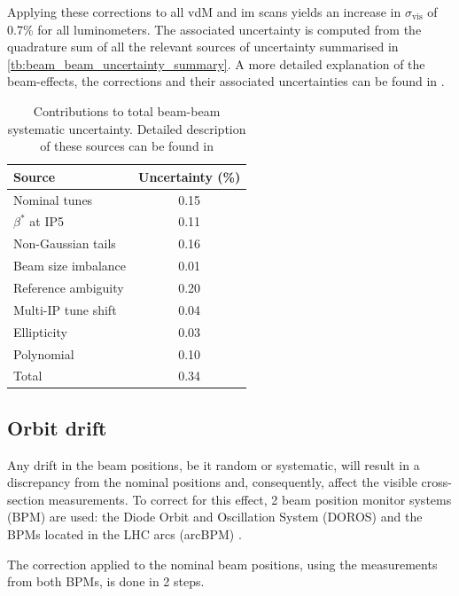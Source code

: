 Applying these corrections to all vdM and im scans yields an increase in $\sigma_{\mathrm{vis}}$ of 0.7\% for all luminometers. The associated uncertainty is computed from the quadrature sum of all the relevant sources of uncertainty summarised in \autoref{tb:beam_beam_uncertainty_summary}. A more detailed explanation of the beam-effects, the corrections and their associated uncertainties can be found in \cite{babaev2021coherentdeflectionellipticbunches}.

\begin{table}
	\centering
	\caption[Beam-beam systematic uncertainty]{Contributions to total beam-beam systematic uncertainty. Detailed description of these sources can be found in \cite{babaev2021coherentdeflectionellipticbunches}}\label{tab:bb:1}
	\label{tb:beam_beam_uncertainty_summary}
	\begin{tabular}{l|c}
		\hline
		Source & Uncertainty (\%) \\
		\hline
		Nominal tunes & 0.15 \\
		$\beta^{*}$ at IP5 & 0.11 \\
		Non-Gaussian tails & 0.16 \\
		Beam size imbalance & 0.01 \\
		Reference ambiguity & 0.20 \\
		Multi-IP tune shift & 0.04 \\
		Ellipticity & 0.03 \\
		Polynomial & 0.10 \\
		\hline
		Total & 0.34 \\
		\hline
	\end{tabular}
\end{table}

\subsection{Orbit drift}

Any drift in the beam positions, be it random or systematic, will result in a discrepancy from the nominal positions and, consequently, affect the visible cross-section measurements. To correct for this effect, 2 beam position monitor systems (BPM) are used: the Diode Orbit and Oscillation System (DOROS) \cite{Gąsior:2313935} and the BPMs located in the LHC arcs (arcBPM) \cite{Sirunyan:2759951}.

The correction applied to the nominal beam positions, using the measurements from both BPMs, is done in 2 steps.

